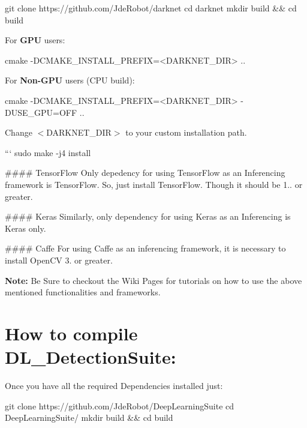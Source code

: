 \begin{DoxyCode}
git clone https://github.com/JdeRobot/darknet
cd darknet
mkdir build && cd build
\end{DoxyCode}


For {\bfseries G\+PU} users\+:~\newline
 
\begin{DoxyCode}
cmake -DCMAKE\_INSTALL\_PREFIX=<DARKNET\_DIR> ..
\end{DoxyCode}
 For {\bfseries Non-\/\+G\+PU} users (C\+PU build)\+:


\begin{DoxyCode}
cmake -DCMAKE\_INSTALL\_PREFIX=<DARKNET\_DIR> -DUSE\_GPU=OFF ..
\end{DoxyCode}
 Change {\ttfamily $<$D\+A\+R\+K\+N\+E\+T\+\_\+\+D\+IR$>$} to your custom installation path.


\begin{DoxyCode}
``` sudo make -j4 install
\end{DoxyCode}



\begin{DoxyItemize}
\item \#\#\#\# Tensor\+Flow Only depedency for using Tensor\+Flow as an Inferencing framework is Tensor\+Flow. So, just install Tensor\+Flow. Though it should be 1.. or greater.
\item \#\#\#\# Keras Similarly, only dependency for using Keras as an Inferencing is Keras only.
\item \#\#\#\# Caffe For using Caffe as an inferencing framework, it is necessary to install Open\+CV 3. or greater.
\end{DoxyItemize}

{\bfseries Note\+:} Be Sure to checkout the Wiki Pages for tutorials on how to use the above mentioned functionalities and frameworks.

\section*{How to compile D\+L\+\_\+\+Detection\+Suite\+:}

Once you have all the required Dependencies installed just\+:


\begin{DoxyCode}
git clone https://github.com/JdeRobot/DeepLearningSuite
cd DeepLearningSuite/
mkdir build && cd build
\end{DoxyCode}
 

